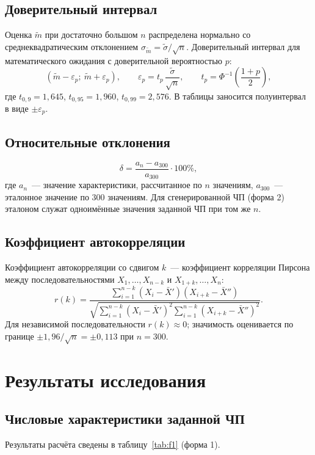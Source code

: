 \documentclass[a4paper,12pt]{article}
\begin{document}
\subsection{Доверительный интервал}
Оценка $\tilde m$ при достаточно большом $n$ распределена нормально со среднеквадратическим отклонением $\sigma_{\tilde m}=\tilde\sigma/\sqrt n$. Доверительный интервал для математического ожидания с доверительной вероятностью $p$:
\begin{equation}
\left(\tilde m-\varepsilon_p;\ \tilde m+\varepsilon_p\right),\qquad
\varepsilon_p=t_p\,\frac{\tilde\sigma}{\sqrt n},\qquad t_p=\Phi^{-1}\!\left(\frac{1+p}{2}\right),
\end{equation}
где $t_{0{,}9}=1{,}645$, $t_{0{,}95}=1{,}960$, $t_{0{,}99}=2{,}576$. В таблицы заносится полуинтервал в виде $\pm\varepsilon_p$.

\subsection{Относительные отклонения}
\begin{equation}
\delta=\frac{a_n-a_{300}}{a_{300}}\cdot 100\%,
\end{equation}
где $a_n$~--- значение характеристики, рассчитанное по $n$ значениям, $a_{300}$~--- эталонное значение по 300 значениям. Для сгенерированной ЧП (форма 2) эталоном служат одноимённые значения заданной ЧП при том же $n$.

\subsection{Коэффициент автокорреляции}
Коэффициент автокорреляции со сдвигом $k$~--- коэффициент корреляции Пирсона между последовательностями $X_1,\dots,X_{n-k}$ и $X_{1+k},\dots,X_n$:
\begin{equation}
r(k)=\frac{\sum_{i=1}^{n-k}\left(X_i-\bar X'\right)\left(X_{i+k}-\bar X''\right)}
{\sqrt{\sum_{i=1}^{n-k}\left(X_i-\bar X'\right)^2\sum_{i=1}^{n-k}\left(X_{i+k}-\bar X''\right)^2}}.
\end{equation}
Для независимой последовательности $r(k)\approx 0$; значимость оценивается по границе $\pm 1{,}96/\sqrt n=\pm0{,}113$ при $n=300$.

\section{Результаты исследования}

\subsection{Числовые характеристики заданной ЧП}
Результаты расчёта сведены в таблицу~\ref{tab:f1} (форма 1).
\end{document}
